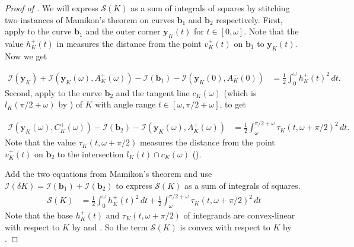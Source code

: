 \begin{proof}[Proof of ]
We will express \(\mathcal{S}(K)\) as a sum of integrals of squares by stitching two instances of Mamikon’s theorem on curves \(\mathbf{b}_1\) and \(\mathbf{b}_2\) respectively. First, apply  to the curve \(\mathbf{b}_1\) and the outer corner \(\mathbf{y}_K(t)\) for \(t \in [0, \omega]\). Note that the value \(h_K^+(t)\) in  measures the distance from the point \(v_K^+(t)\) on \(\mathbf{b}_1\) to \(\mathbf{y}_K(t)\). Now we get

\begin{align*}
\mathcal{I}(\mathbf{y}_K) + \mathcal{I}(\mathbf{y}_K(\omega), A_K^+(\omega)) - \mathcal{I}(\mathbf{b}_1) - \mathcal{I}(\mathbf{y}_K(0), A_K^-(0)) & = \frac{1}{2} \int_0^\omega h^+_K(t)^2 \, dt.
\end{align*}
Second, apply  to the curve \(\mathbf{b}_2\) and the tangent line \(c_K(\omega)\) (which is \(l_K(\pi/2 + \omega)\) by ) of \(K\) with angle range \(t \in [\omega, \pi/2 + \omega]\), to get

\begin{align*}
\mathcal{I}(\mathbf{y}_K(\omega), C^+_K(\omega)) -
\mathcal{I}(\mathbf{b}_2) - 
\mathcal{I}(\mathbf{y}_K(\omega), A_K^+(\omega))
& = \frac{1}{2} \int_{\omega}^{\pi/2 + \omega} \tau_K(t, \omega + \pi/2)^2 \, dt.
\end{align*}
Note that the value \(\tau_K(t, \omega + \pi/2)\) measures the distance from the point \(v_K^+(t)\) on \(\mathbf{b}_2\) to the intersection \(l_K(t) \cap c_K(\omega)\) ().

Add the two equations from Mamikon’s theorem and use \(\mathcal{I}(\delta K) = \mathcal{I}(\mathbf{b}_1) + \mathcal{I}(\mathbf{b}_2)\) to express \(\mathcal{S}(K)\) as a sum of integrals of squares.
\begin{equation}
\label{eqn:sk}
\begin{split}
\mathcal{S}(K) & = \frac{1}{2} \int_0^\omega h^+_K(t)^2 \, dt +  \frac{1}{2} \int_{\omega}^{\pi/2 + \omega} \tau_K(t, \omega + \pi/2)^2 \, dt
\end{split}
\end{equation}
Note that the base \(h_K^+(t)\) and \(\tau_K(t, \omega + \pi/2)\) of integrands are convex-linear with respect to \(K\) by  and . So the term \(\mathcal{S}(K)\) is convex with respect to \(K\) by .


\end{proof}
